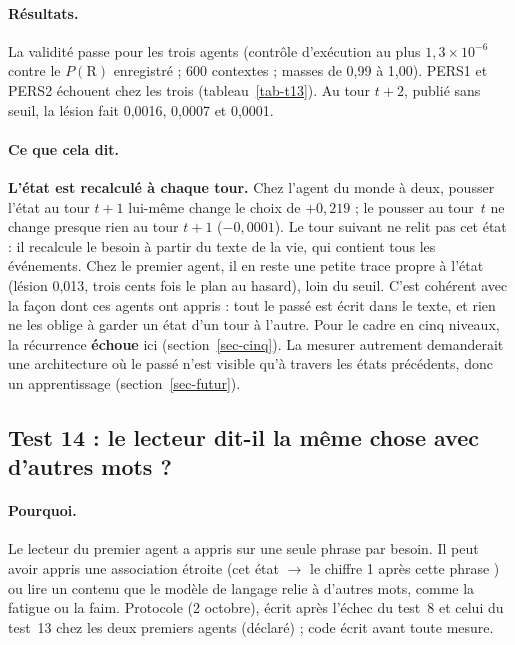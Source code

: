 \documentclass[11pt,a4paper]{article}
\newcommand{\code}[1]{\texttt{\detokenize{#1}}}
\begin{document}
\paragraph{Résultats.} La validité passe pour les trois agents (contrôle d'exécution au
plus $1,3\times10^{-6}$ contre le $P(\mathrm R)$ enregistré ; 600 contextes ; masses de
0,99 à 1,00). PERS1 et PERS2 échouent chez les trois (tableau~\ref{tab-t13}). Au tour
$t+2$, publié sans seuil, la lésion fait 0,0016, 0,0007 et 0,0001.

\paragraph{Ce que cela dit.} \textbf{L'état est recalculé à chaque tour.} Chez l'agent
du monde à deux, pousser l'état au tour $t+1$ lui-même change le choix de $+0,219$ ;
le pousser au tour~$t$ ne change presque rien au tour $t+1$ ($-0,0001$). Le tour
suivant ne relit pas cet état : il recalcule le besoin à partir du texte de la vie, qui
contient tous les événements. Chez le premier agent, il en reste une petite trace
propre à l'état (lésion 0,013, trois cents fois le plan au hasard), loin du seuil.
C'est cohérent avec la façon dont ces agents ont appris : tout le passé est écrit dans
le texte, et rien ne les oblige à garder un état d'un tour à l'autre. Pour le cadre en
cinq niveaux, la récurrence \textbf{échoue} ici (section~\ref{sec-cinq}). La mesurer
autrement demanderait une architecture où le passé n'est visible qu'à travers les
états précédents, donc un apprentissage (section~\ref{sec-futur}).

\subsection{Test 14 : le lecteur dit-il la même chose avec d'autres mots ?}
\label{sec-t14}

\paragraph{Pourquoi.} Le lecteur du premier agent a appris sur une seule phrase par
besoin. Il peut avoir appris une association étroite (\og cet état $\to$ le chiffre 1
après cette phrase \fg{}) ou lire un contenu que le modèle de langage relie à
d'autres mots, comme la fatigue ou la faim. Protocole \code{6330c2c} (2 octobre),
écrit après l'échec du test~8 et celui du test~13 chez les deux premiers agents
(déclaré) ; code \code{79b7e53} écrit avant toute mesure.
\end{document}
